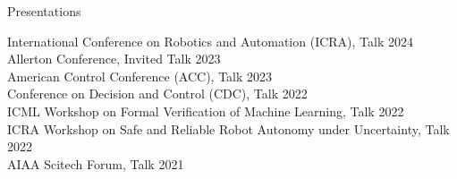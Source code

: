 \begin{rSection}{Presentations}
    
    International Conference on Robotics and Automation (ICRA), Talk \hfill {2024}\\
    Allerton Conference, Invited Talk \hfill {2023}\\
    American Control Conference (ACC), Talk \hfill {2023}\\
    Conference on Decision and Control (CDC), Talk \hfill {2022}\\
    ICML Workshop on Formal Verification of Machine Learning, Talk \hfill {2022}\\
    ICRA Workshop on Safe and Reliable Robot Autonomy under Uncertainty, Talk \hfill {2022}\\
    AIAA Scitech Forum, Talk \hfill {2021}\\

\end{rSection}